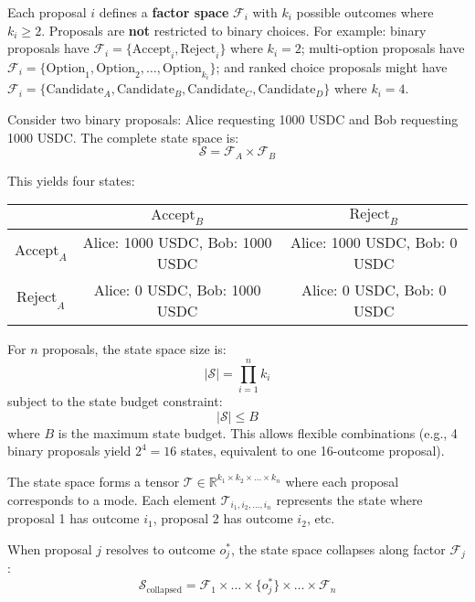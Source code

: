 \documentclass{article}
\begin{document}
Each proposal $i$ defines a \textbf{factor space} $\mathcal{F}_i$ with $k_i$ possible outcomes where $k_i \geq 2$. Proposals are \textbf{not} restricted to binary choices. For example: binary proposals have $\mathcal{F}_i = \{\text{Accept}_i, \text{Reject}_i\}$ where $k_i = 2$; multi-option proposals have $\mathcal{F}_i = \{\text{Option}_1, \text{Option}_2, \ldots, \text{Option}_{k_i}\}$; and ranked choice proposals might have $\mathcal{F}_i = \{\text{Candidate}_A, \text{Candidate}_B, \text{Candidate}_C, \text{Candidate}_D\}$ where $k_i = 4$.

Consider two binary proposals: Alice requesting 1000 USDC and Bob requesting 1000 USDC. The complete state space is:
    \begin{equation}
    \mathcal{S} = \mathcal{F}_A \times \mathcal{F}_B
    \end{equation}
    
    This yields four states:
    \begin{center}
    \begin{tabular}{|c|c|c|}
    \hline
    & $\text{Accept}_B$ & $\text{Reject}_B$ \\
    \hline
    $\text{Accept}_A$ & Alice: 1000 USDC, Bob: 1000 USDC & Alice: 1000 USDC, Bob: 0 USDC \\
    \hline
    $\text{Reject}_A$ & Alice: 0 USDC, Bob: 1000 USDC & Alice: 0 USDC, Bob: 0 USDC \\
    \hline
    \end{tabular}
    \end{center}

For $n$ proposals, the state space size is:
    \begin{equation}
    |\mathcal{S}| = \prod_{i=1}^{n} k_i
    \end{equation}
    subject to the state budget constraint:
    \begin{equation}
    |\mathcal{S}| \leq B
    \end{equation}
    where $B$ is the maximum state budget. This allows flexible combinations (e.g., 4 binary proposals yield $2^4 = 16$ states, equivalent to one 16-outcome proposal).

The state space forms a tensor $\mathcal{T} \in \mathbb{R}^{k_1 \times k_2 \times \ldots \times k_n}$ where each proposal corresponds to a mode. Each element $\mathcal{T}_{i_1, i_2, \ldots, i_n}$ represents the state where proposal 1 has outcome $i_1$, proposal 2 has outcome $i_2$, etc.

    When proposal $j$ resolves to outcome $o_j^*$, the state space collapses along factor $\mathcal{F}_j$:
    \begin{equation}
    \mathcal{S}_{\text{collapsed}} = \mathcal{F}_1 \times \ldots \times \{o_j^*\} \times \ldots \times \mathcal{F}_n
    \end{equation}
    
\end{document}
